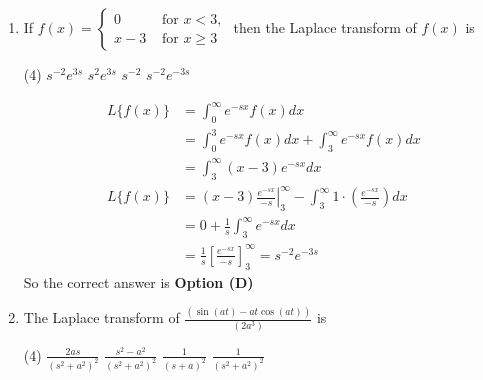 \begin{enumerate}
	\begin{tasks}(4)
		\task[\textbf{A.}] $\frac{1}{(s+a)(s+b)}$
		\task[\textbf{B.}] $\frac{1}{b(s+a)}$
		\task[\textbf{C.}] $\frac{1}{a(s+b)}$
		\task[\textbf{D.}] $\frac{e^{-a}-e^{-b}}{b-a}$
	\end{tasks}
	\begin{answer}
		\begin{align*}
		\text{Given }\frac{d y}{d t}+a y&=e^{-b t}
		\intertext{Taking Laplace transform of both sides}
		\text{	We obtain}\\
		L\left\{\frac{d y}{d t}\right\}+a L\{y(t)\}&=L\left\{e^{-b t}\right\} \Rightarrow s Y(s)-y(0)+a Y(s)=\frac{1}{s+b}\\
		\text{Since, }	y(0)&=0,\text{ we obtain}\\
		(s+a) Y(s)&=\frac{1}{s+b} \Rightarrow Y(s)=\frac{1}{(s+a)(s+b)}
		\end{align*}
		So the correct answer is \textbf{Option (A)}
	\end{answer}
	\item If $f(x)=\left\{\begin{array}{ll}0 & \text { for } x<3, \\ x-3 & \text { for } x \geq 3\end{array}\right.$ then the Laplace transform of $f(x)$ is
	{}
	
	\begin{tasks}(4)
		\task[\textbf{A.}] $s^{-2} e^{3 s}$
		\task[\textbf{B.}] $s^{2} e^{3 s}$
		\task[\textbf{C.}] $s^{-2}$
		\task[\textbf{D.}] $s^{-2} e^{-3 s}$
	\end{tasks}
	\begin{answer}
		\begin{align*}
		L\{f(x)\}&=\int_{0}^{\infty} e^{-s x} f(x) d x\\&=\int_{0}^{3} e^{-s x} f(x) d x+\int_{3}^{\infty} e^{-s x} f(x) d x\\&=\int_{3}^{\infty}(x-3) e^{-s x} d x\\
		L\{f(x)\}&=\left.(x-3) \frac{e^{-s x}}{-s}\right|_{3} ^{\infty}-\int_{3}^{\infty} 1 \cdot\left(\frac{e^{-s x}}{-s}\right) d x\\&=0+\frac{1}{s} \int_{3}^{\infty} e^{-s x} d x\\&=\frac{1}{s}\left[\frac{e^{-s x}}{-s}\right]_{3}^{\infty}=s^{-2} e^{-3 s}
		\end{align*}
		So the correct answer is \textbf{Option (D)}
	\end{answer}
	\item The Laplace transform of $\frac{(\sin (a t)-a t \cos (a t))}{\left(2 a^{3}\right)}$ is 
	{}
	
	\begin{tasks}(4)
		\task[\textbf{A.}] $\frac{2 a s}{\left(s^{2}+a^{2}\right)^{2}}$
		\task[\textbf{B.}]$\frac{s^{2}-a^{2}}{\left(s^{2}+a^{2}\right)^{2}}$
		\task[\textbf{C.}]$\frac{1}{(s+a)^{2}}$
		\task[\textbf{D.}]$\frac{1}{\left(s^{2}+a^{2}\right)^{2}}$
	\end{tasks}
\end{enumerate}
